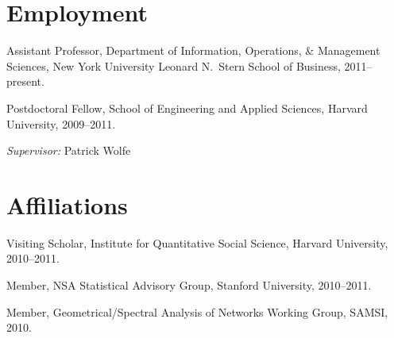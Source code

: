 \documentclass[10pt,letterpaper]{article}
\renewenvironment{itemize}{
  \begin{list}{}{
    \setlength{\leftmargin}{1.5em}
    \setlength{\itemsep}{0.25em}
    \setlength{\parskip}{0pt}
    \setlength{\parsep}{0.25em}
  }
}{
  \end{list}
}
\begin{document}
\section*{Employment}

\begin{itemize}
\item Assistant Professor, Department of Information, Operations, \&
  Management Sciences, New York University Leonard N.~Stern School of Business,
  2011--present.
\item Postdoctoral Fellow, School of Engineering and Applied Sciences, Harvard
  University, 2009--2011.
  \begin{itemize}
  \item \textit{Supervisor:} Patrick Wolfe
  \end{itemize}
\end{itemize}




\section*{Affiliations}
\begin{itemize}
\item Visiting Scholar, Institute for Quantitative Social Science, Harvard University, 2010--2011.
\item Member, NSA Statistical Advisory Group, Stanford University, 2010--2011.
\item Member, Geometrical/Spectral Analysis of Networks Working Group, SAMSI, 2010.
\end{itemize}
\end{document}
